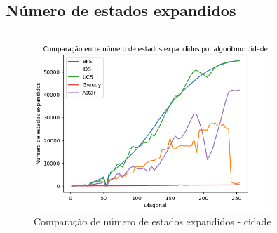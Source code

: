 \documentclass{article}
\begin{document}
\begin{figure}[H]
		\centering
\end{figure}

\subsection{Número de estados expandidos}

\begin{figure}[H]
	\centering
	\includegraphics[width=0.8\textwidth]{../images/cidade_state_benchmark.png}
	\caption{Comparação de número de estados expandidos - cidade}
\end{figure}
\end{document}
